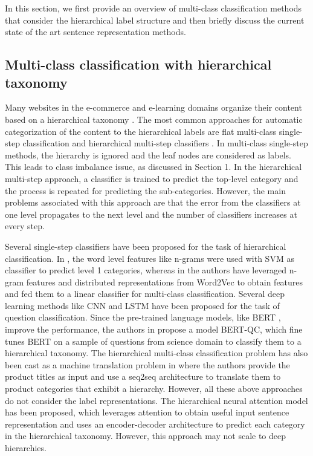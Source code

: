 \documentclass[runningheads, envcountsame, a4paper]{llncs}
\begin{document}
In this section, we first provide an overview of multi-class classification methods that consider the hierarchical label structure and then briefly discuss the current state of the art sentence representation methods.


\setlength{\parindent}{0pt}

\subsection{Multi-class classification with hierarchical taxonomy}
\setlength{\parindent}{0pt}
Many websites in the e-commerce and e-learning domains organize their content based on a hierarchical taxonomy \cite{xumulti,kozareva2015everyone}. The most common approaches for automatic categorization of the content to the hierarchical labels are flat multi-class single-step classification  and hierarchical multi-step classifiers \cite{article,yu2012product}. In multi-class single-step methods, the hierarchy is ignored and the leaf nodes are considered as labels. This leads to class imbalance issue, as discussed in Section 1. In the hierarchical multi-step approach, a classifier is trained to predict the top-level category and the process is repeated for predicting the sub-categories. However, the main problems associated with this approach are that the error from the classifiers at one level propagates to the next level and the number of classifiers increases at every step.

Several single-step classifiers have been proposed for the task of hierarchical classification. In \cite{yu2012product}, the word level features like n-grams were used with SVM as classifier to predict level 1 categories, whereas in \cite{kozareva2015everyone} the authors have leveraged n-gram features and distributed representations from Word2Vec to obtain features and fed them to a linear classifier for multi-class classification. Several deep learning methods like CNN \cite{10.1145/3302425.3302483} and LSTM \cite{article} have been proposed for the task of question classification. Since the pre-trained language models, like BERT \cite{BERT}, improve the performance, the authors in \cite{xumulti} propose a model BERT-QC, which fine tunes BERT on a sample of questions from science domain to classify them to a hierarchical taxonomy. The hierarchical multi-class classification problem has also been cast as a machine translation problem in \cite{MachinT} where the authors provide the product titles as input and use a seq2seq architecture to translate them to product categories that exhibit a hierarchy. However, all these above approaches do not consider the label representations. The hierarchical neural attention model \cite{sinha2018hierarchical} has been proposed, which leverages attention to obtain useful input sentence representation and uses an encoder-decoder architecture to predict each category in the hierarchical taxonomy. However, this approach may not scale to deep hierarchies.
\end{document}
